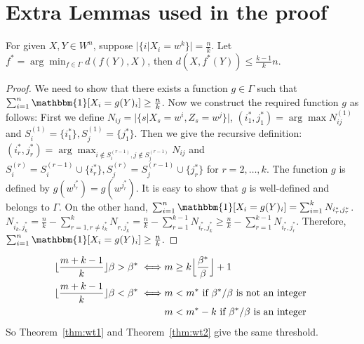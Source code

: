 \documentclass{article}
\begin{document}
\section{Extra Lemmas used in the proof}
\begin{lemma}
	For given $X, Y \in W^n$, suppose $|\{i | X_i = w^k \}| = \frac{n}{k}$.
	Let $f^*=\arg\min_{f \in \Gamma } d(f(Y), X)$, then $d(X,f^*(Y)) \leq \frac{k-1}{k}n$.
\end{lemma}
\begin{proof}
	We need to show that there exists a function $g\in \Gamma$ such that $\sum_{i=1}^n \mathbbm{1}[X_i=g(Y)_i] \geq \frac{n}{k}$.
	Now we construct the required function $g$ as follows:
	First we define $N_{ij} = |\{s | X_s = w^i, Z_s = w^j\}|$, $(i_1^*,j_1^*) = \arg\max N^{(1)}_{ij}$ and $S^{(1)}_i = \{i_1^*\}, S_j^{(1)}=\{j_1^*\}$.
	Then we give the recursive definition:
	$(i_r^*,j_r^*) = \arg\max_{i \not\in S_i^{(r-1)}, j \not\in S_j^{(r-1)}} N_{ij}$ and $S^{(r)}_i = S^{(r-1)}_i \cup \{i_r^*\}, S_j^{(r)}= S_j^{(r-1)}\cup \{j_r^*\}$ for $r=2, \dots, k$.
	The function $g$ is defined by $g(w^{i_r^*}) = g(w^{j_r^*})$. It is easy to show that $g$ is well-defined and belongs to $\Gamma$.
	On the other hand, $\sum_{i=1}^n \mathbbm{1}[X_i=g(Y)_i] = \sum_{i=1}^k N_{i_r^*,j_r^*}$.
	$N_{i_k^*, j_k^*} = \frac{n}{k} - \sum_{r=1, r\neq i_k^*}^k N_{r,j_k^*} = \frac{n}{k} - \sum_{r=1}^{k-1} N_{i^*_r,j_k^*} \geq \frac{n}{k} - \sum_{r=1}^{k-1} N_{i^*_r,j^*_r}$. Therefore,  $\sum_{i=1}^n \mathbbm{1}[X_i=g(Y)_i] \geq \frac{n}{k}$.
\end{proof}
\begin{lemma}\label{lem:thm23eq}
	\begin{align}
	\lfloor \frac{m+k-1}{k} \rfloor \beta>\beta^\ast \iff  & m\ge k \Big\lfloor \frac{\beta^\ast}{\beta} \Big\rfloor + 1 \label{eq:m2} \\
	\lfloor \frac{m+k-1}{k} \rfloor \beta <\beta^\ast  \iff & m <  m^* \textrm{ if } \beta^*/\beta \textrm{ is not an integer } \notag \\
	& m <  m^* - k \textrm{ if } \beta^*/\beta \textrm{ is an integer } \label{eq:m22}
	\end{align}
	So Theorem~\ref{thm:wt1} and Theorem~\ref{thm:wt2} give the same threshold.
\end{lemma}
\end{document}
